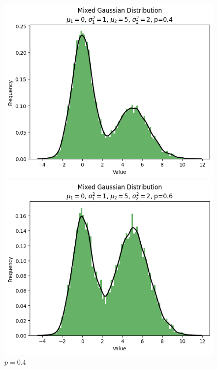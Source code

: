 \documentclass{article}
\begin{document}
\begin{figure}[H]
\begin{minipage}[b]{0.3\linewidth}
        \caption{$p=0.2$}
    \end{minipage}
    \hfill
    \begin{minipage}[b]{0.3\linewidth}
        \centering
        \includegraphics[width=\linewidth]{figure/p=0.4.png}
        \caption{$p=0.4$}
    \end{minipage}
    \vspace{4mm} %
    \begin{minipage}[b]{0.3\linewidth}
        \centering
        \includegraphics[width=\linewidth]{figure/p=0.6.png}

\end{minipage}
\end{figure}
\end{document}

